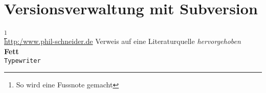 \section{Versionsverwaltung mit Subversion} \label{sec:impl-Versionsverwaltung}
\footnote{So wird eine Fussnote gemacht}\\
\url{http:/www.phil-schneider.de}
\citep{Frotscher2004b} Verweis auf eine Literaturquelle
\emph{hervorgehoben}\\
\textbf{Fett}\\
\texttt{Typewriter}\\


		
